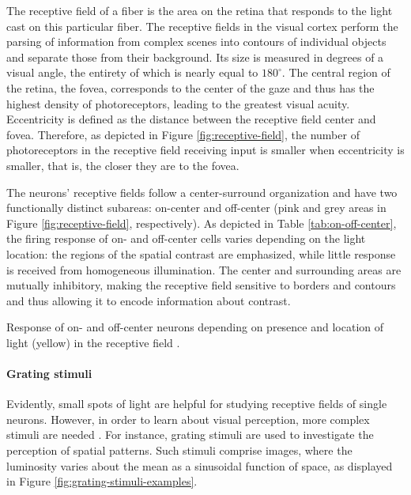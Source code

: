 The receptive field of a fiber is the area on the retina that responds to the light cast on this particular fiber. The receptive fields in the visual cortex perform the parsing of information from complex scenes into contours of individual objects and separate those from their background. Its size is measured in degrees of a visual angle, the entirety of which is nearly equal to $180^\circ$.
The central region of the retina, the fovea, corresponds to the center of the gaze and thus has the highest density of photoreceptors, leading to the greatest visual acuity. Eccentricity is defined as the distance between the receptive field center and fovea. Therefore, as depicted in Figure \ref{fig:receptive-field}, the number of photoreceptors in the receptive field receiving input is smaller when eccentricity is smaller, that is, the closer they are to the fovea.

The neurons' receptive fields follow a center-surround organization and have two functionally distinct subareas: on-center and off-center (pink and grey areas in Figure \ref{fig:receptive-field}, respectively). As depicted in Table \ref{tab:on-off-center}, the firing response of on- and off-center cells varies depending on the light location: the regions of the spatial contrast are emphasized, while little response is received from homogeneous illumination. The center and surrounding areas are mutually inhibitory, making the receptive field sensitive to borders and contours and thus allowing it to encode information about contrast.

\begin{table}[!htp]
    \centering
    
    \caption{Response of on- and off-center neurons depending on presence and location of light (yellow) in the receptive field \cite{KandelBook2003:25}.}
    \label{tab:on-off-center}
\end{table}

\paragraph{Grating stimuli}

Evidently, small spots of light are helpful for studying receptive fields of single neurons. However, in order to learn about visual perception, more complex stimuli are needed \cite{KandelBook2003:26}. For instance, grating stimuli are used to investigate the perception of spatial patterns. Such stimuli comprise images, where the luminosity varies about the mean as a sinusoidal function of space, as displayed in Figure \ref{fig:grating-stimuli-examples}. 

